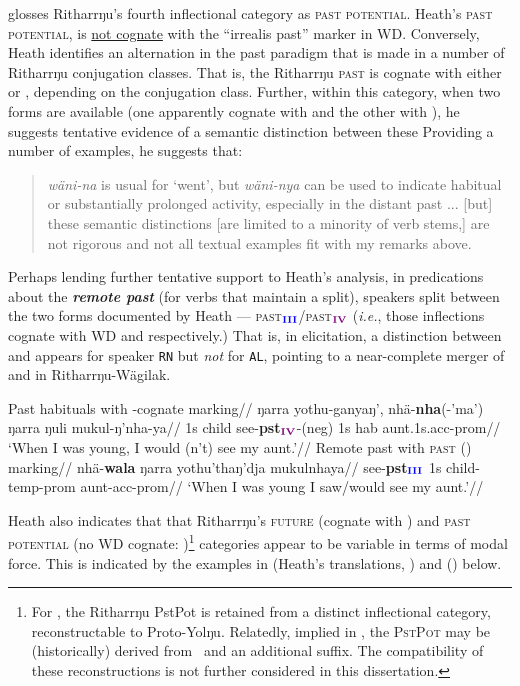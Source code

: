\citet[74-5]{Heath1980r} glosses Ritharrŋu's fourth inflectional category as \textsc{past potential}. Heath's \textsc{past potential}, is \ul{not cognate} with the ``irrealis past'' marker \IV{} in WD. Conversely, Heath identifies an alternation in the past paradigm that is made in a number of Ritharrŋu conjugation classes. That is, the Ritharrŋu \textsc{past} is cognate with either \III{} or \IV{}, depending on the conjugation class. Further, within this category, when two forms are available (one apparently cognate with \III{} and the other with \IV{}), he suggests tentative evidence of a semantic distinction between these 
 Providing a number of examples, he suggests that:
\begin{quote} \textit{wäni-na} is usual for `went', but \textit{wäni-nya} can be used to indicate habitual or substantially prolonged activity, especially in the distant past ... [but] these semantic distinctions [are limited to a minority of verb stems,] are not rigorous and not all textual examples fit with my remarks above.
\end{quote}

Perhaps lending further tentative support to Heath's analysis, in predications about the \textbf{\textit{remote past}} (for verbs that maintain a split), speakers split between the two forms documented by Heath --- \textsc{past$ _{\textbf{\textcolor{blue}{III}}} $/past$ _{\textbf{\textcolor{violet}{IV}}} $} (\textit{i.e.}, those inflections cognate with WD \III{} and \IV{} respectively.) That is, in elicitation, a distinction between \III{} and \IV{} appears for speaker \texttt{RN} but \textit{not} for \texttt{AL}, pointing to a near-complete merger of \III{} and \IV{} in Ritharrŋu-Wägilak.

\pex\a\begingl\glpreamble Past habituals with \IV-cognate marking//
 \gla ŋarra yothu-ganyaŋ', nhä-\textbf{nha}(-'ma') ŋarra ŋuli mukul-ŋ'nha-ya//
\glb 1s child see-\textbf{\gls{pst}}$_{\textbf{\textcolor{violet}{IV}}}$-(\gls{neg}) 1s \gls{hab} aunt.1s.\gls{acc}-\gls{prom}//
\glft`When I was young, I would (n't) see my aunt.'\trailingcitation{[RN~20190522]}//\endgl
\a\begingl\glpreamble Remote past with \textsc{past} (\III) marking//
\gla nhä-\textbf{wala} ŋarra yothu'thaŋ'dja mukulnhaya//
\glb see-\textbf{\gls{pst}}$_{\textbf{\textcolor{blue}{III}}}$ 1s child-\gls{temp}-\gls{prom} aunt-\gls{acc}-\gls{prom}//
\glft `When I was young I saw/would see my aunt.'\trailingcitation{[AL~20190522]}//\endgl
\xe




Heath also indicates that that Ritharrŋu's \textsc{future} (cognate with \II) and \textsc{past potential} (no WD cognate: \V)\footnote{For \citet{Bowern2009}, the Ritharrŋu \gls{PstPot} is retained from a distinct inflectional category, reconstructable to Proto-Yolŋu. Relatedly, implied in \citet[20,23,104]{Heath1980r}, the \textsc{PstPot} may be (historically) derived from \II~and an additional suffix. The compatibility of these reconstructions is not further considered in this dissertation.} categories appear to be variable in terms of modal force. This is indicated by the examples in (Heath's translations, \nextx) and () below.

